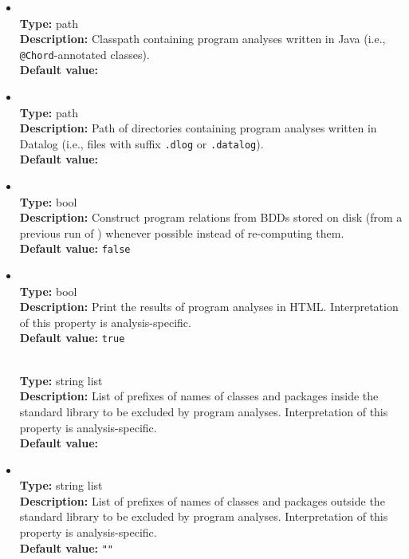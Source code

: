 \begin{itemize}
\item
{} \\
{\bf Type:} path \\
{\bf Description:} Classpath containing program analyses written in Java (i.e., {\tt @Chord}-annotated classes). \\
{\bf Default value:}  

\item
{} \\
{\bf Type:} path \\
{\bf Description:} Path of directories containing program analyses written in Datalog (i.e., files with suffix {\tt .dlog} or {\tt .datalog}). \\
{\bf Default value:}  

\item
{} \\
{\bf Type:} bool \\
{\bf Description:} Construct program relations from BDDs stored on disk (from a previous run of \Chord) whenever possible instead of re-computing them. \\
{\bf Default value:} {\tt false} 

\item
{} \\
{\bf Type:} bool \\
{\bf Description:} Print the results of program analyses in HTML.  Interpretation of this property is analysis-specific. \\
{\bf Default value:} {\tt true} 

 \\
{\bf Type:} string list \\
{\bf Description:} List of prefixes of names of classes and packages inside the standard library to be excluded by program analyses.  Interpretation of this property is analysis-specific. \\
{\bf Default value:}  

\item
{} \\
{\bf Type:} string list \\
{\bf Description:} List of prefixes of names of classes and packages outside the standard library to be excluded by program analyses.  Interpretation of this property is analysis-specific. \\
{\bf Default value:} {\tt ""}


\end{itemize}
